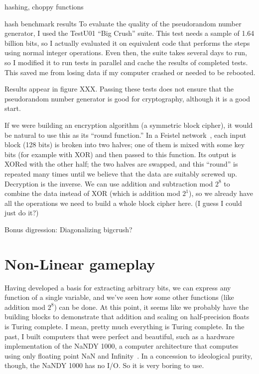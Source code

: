 \documentclass[twocolumn]{article}
\begin{document}
hashing,
choppy functions



hash benchmark results
To evaluate the quality of the pseudorandom number generator, I used the TestU01 ``Big Crush'' suite. This test needs a sample of 1.64 billion bits, so I actually evaluated it on equivalent code that performs the steps using normal integer operations. Even then, the suite takes several days to run, so I modified it to run tests in parallel and cache the results of completed tests. This saved me from losing data if my computer crashed or needed to be rebooted.

Results appear in figure XXX. Passing these tests does not ensure that the pseudorandom number generator is good for cryptography, although it is a good start.

If we were building an encryption algorithm (a symmetric block
cipher), it would be natural to use this as its ``round function.'' In
a Feistel network~\cite{feistel1973cryptography}, each input block
(128 bits) is broken into two halves; one of them is mixed with some
key bits (for example with XOR) and then passed to this function. Its
output is XORed with the other half; the two halves are swapped, and
this ``round'' is repeated many times until we believe that the data
are suitably screwed up. Decryption is the inverse. We can use
addition and subtraction mod $2^8$ to combine the data instead of XOR
(which is addition mod $2^1$), so we already have all the operations
we need to build a whole block cipher here. (I guess I could just do
it?)

Bonus digression:
Diagonalizing bigcrush?


\section{Non-Linear gameplay} \label{sec:sixtyfive}
Having developed a basis for extracting arbitrary bits, we can express
any function of a single variable, and we've seen how some other
functions (like addition mod $2^8$) can be done. At this point, it
seems like we probably have the building blocks to demonstrate that
addition and scaling on half-precision floats is Turing complete. I
mean, pretty much everything is Turing complete. In the past, I built
computers that were perfect and beautiful, such as a hardware
implementation of the NaNDY 1000, a computer architecture that
computes using only floating point NaN and
Infinity~\cite{murphy2019nan}. In a concession to ideological purity,
though, the NaNDY 1000 has no I/O. So it is very boring to use.
\end{document}
